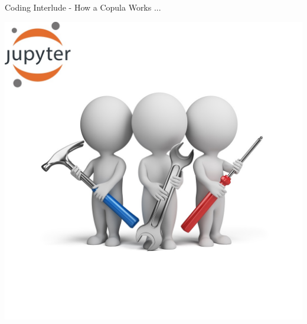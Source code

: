 \documentclass[11pt]{beamer}
\theoremstyle{plain}
\theoremstyle{definition}
\theoremstyle{remark}
\begin{document}
\begin{frame}{Coding Interlude - How a Copula Works ...}
\begin{center}
\includegraphics[scale=.8]{fig/exercise.jpg} 
\end{center}
\end{frame}
%
\end{document}
